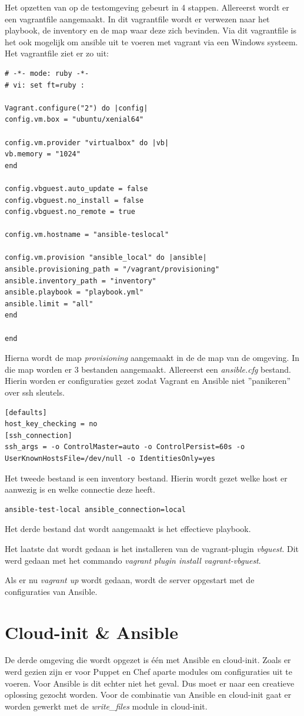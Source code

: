 Het opzetten van op de testomgeving gebeurt in 4 stappen. Allereerst wordt er een vagrantfile aangemaakt. In dit vagrantfile wordt er verwezen naar het playbook, de inventory en de map waar deze zich bevinden. Via dit vagrantfile is het ook mogelijk om ansible uit te voeren met vagrant via een Windows systeem. Het vagrantfile ziet er zo uit:
\begin{lstlisting}
# -*- mode: ruby -*-
# vi: set ft=ruby :

Vagrant.configure("2") do |config|
config.vm.box = "ubuntu/xenial64"

config.vm.provider "virtualbox" do |vb|
vb.memory = "1024"
end

config.vbguest.auto_update = false
config.vbguest.no_install = false
config.vbguest.no_remote = true

config.vm.hostname = "ansible-teslocal"

config.vm.provision "ansible_local" do |ansible|
ansible.provisioning_path = "/vagrant/provisioning"
ansible.inventory_path = "inventory"
ansible.playbook = "playbook.yml"
ansible.limit = "all"
end

end
\end{lstlisting}

Hierna wordt de map \textit{provisioning} aangemaakt in de de map van de omgeving. In die map worden er 3 bestanden aangemaakt. Allereerst een \textit{ansible.cfg} bestand. Hierin worden er configuraties gezet zodat Vagrant en Ansible niet ''panikeren'' over ssh sleutels.
\begin{lstlisting}
[defaults]
host_key_checking = no
[ssh_connection]
ssh_args = -o ControlMaster=auto -o ControlPersist=60s -o UserKnownHostsFile=/dev/null -o IdentitiesOnly=yes
\end{lstlisting}
Het tweede bestand is een inventory bestand. Hierin wordt gezet welke host er aanwezig is en welke connectie deze heeft.
\begin{lstlisting}
ansible-test-local ansible_connection=local
\end{lstlisting}

Het derde bestand dat wordt aangemaakt is het effectieve playbook.

Het laatste dat wordt gedaan is het installeren van de vagrant-plugin \textit{vbguest}. Dit werd gedaan met het commando \textit{vagrant plugin install vagrant-vbguest}.

Als er nu \textit{vagrant up} wordt gedaan, wordt de server opgestart met de configuraties van Ansible.

\section{Cloud-init \& Ansible }
De derde omgeving die wordt opgezet is één met Ansible en cloud-init. Zoals er werd gezien zijn er voor Puppet en Chef aparte modules om configuraties uit te voeren. Voor Ansible is dit echter niet het geval. Dus moet er naar een creatieve oplossing gezocht worden. Voor de combinatie van Ansible en cloud-init gaat er worden gewerkt met de \textit{write\_files} module in cloud-init. 

